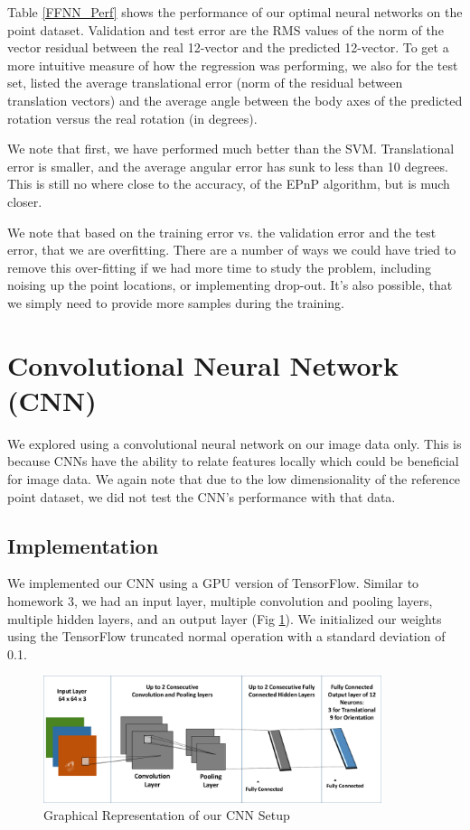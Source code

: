 \documentclass[journal]{IEEEtran}
\begin{document}
Table \ref{FFNN_Perf} shows the performance of our optimal neural networks on the point dataset. Validation and test error are the RMS values of the norm of the vector residual between the real 12-vector and the predicted 12-vector. To get a more intuitive measure of how the regression was performing, we also for the test set, listed the average translational error (norm of the residual between translation vectors) and the average angle between the body axes of the predicted rotation versus the real rotation (in degrees).

We note that first, we have performed much better than the SVM. Translational error is smaller, and the average angular error has sunk to less than 10 degrees. This is still no where close to the accuracy, of the EPnP algorithm, but is much closer.

We note that based on the training error vs. the validation error and the test error, that we are overfitting. There are a number of ways we could have tried to remove this over-fitting if we had more time to study the problem, including noising up the point locations, or implementing drop-out. It's also possible, that we simply need to provide more samples during the training.


\section{Convolutional Neural Network (CNN)}
We explored using a convolutional neural network on our image data only. This is because CNNs have the ability to relate features locally which could be beneficial for image data. We again note that due to the low dimensionality of the reference point dataset, we did not test the CNN's performance with that data. 
\subsection{Implementation}
We implemented our CNN using a GPU version of TensorFlow. Similar to homework 3, we had an input layer, multiple convolution and pooling layers, multiple hidden layers, and an output layer (Fig \ref{Fig:CNN_ARCH}). We initialized our weights using the TensorFlow truncated normal operation with a standard deviation of 0.1.

\begin{figure}
	\centering\hspace{-0 ex}
	\includegraphics[width=3.9in]{CNN_ARCH}
	\caption{Graphical Representation of our CNN Setup}
	\label{Fig:CNN_ARCH}
\end{figure}
\end{document}
